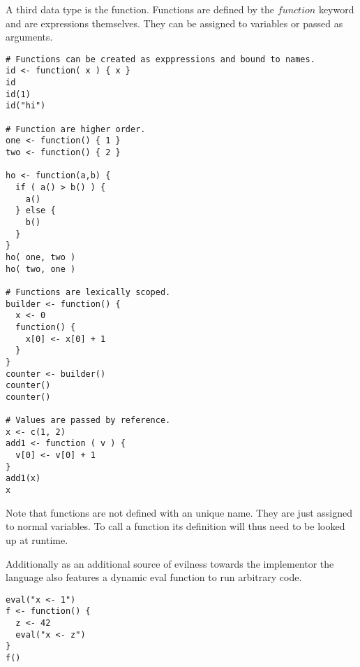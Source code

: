 A third data type is the function. Functions are defined by the $function$ keyword and are expressions themselves. They can be assigned to variables or passed as arguments.

\begin{lstlisting}[language=rift]
# Functions can be created as exppressions and bound to names.
id <- function( x ) { x }
id
id(1)
id("hi")

# Function are higher order.
one <- function() { 1 }
two <- function() { 2 }

ho <- function(a,b) {
  if ( a() > b() ) {
    a()
  } else {
    b()
  }
}
ho( one, two )
ho( two, one )

# Functions are lexically scoped.
builder <- function() {
  x <- 0
  function() {
    x[0] <- x[0] + 1
  }
}
counter <- builder()
counter()
counter()

# Values are passed by reference.
x <- c(1, 2)
add1 <- function ( v ) {
  v[0] <- v[0] + 1
}
add1(x)
x
\end{lstlisting}

Note that functions are not defined with an unique name. They are just assigned to normal variables. To call a function its definition will thus need to be looked up at runtime.

Additionally as an additional source of evilness towards the implementor the language also features a dynamic eval function to run arbitrary code.

\begin{lstlisting}[language=rift]
eval("x <- 1")
f <- function() {
  z <- 42
  eval("x <- z")
}
f()
\end{lstlisting}
